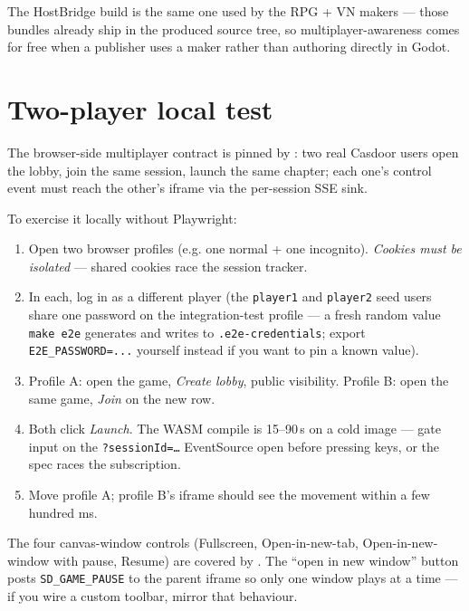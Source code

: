\documentclass[11pt,a4paper,openany]{book}
\begin{document}
The HostBridge build is the same one used by the RPG + VN makers ---
those bundles already ship 
in the produced source tree, so multiplayer-awareness comes for free
when a publisher uses a maker rather than authoring directly in Godot.

\chapter{Two-player local test}
The browser-side multiplayer contract is pinned by
: two real
Casdoor users open the lobby, join the same session, launch the same
chapter; each one's control event must reach the other's iframe via
the per-session SSE sink.

To exercise it locally without Playwright:

\begin{enumerate}
  \item Open two browser profiles (e.g. one normal + one incognito).
        \emph{Cookies must be isolated} --- shared cookies race the
        session tracker.
  \item In each, log in as a different player (the
        \texttt{player1} and \texttt{player2} seed users share one
        password on the integration-test profile — a fresh random
        value \texttt{make e2e} generates and writes to
        \texttt{.e2e-credentials}; export \texttt{E2E\_PASSWORD=...}
        yourself instead if you want to pin a known value).
  \item Profile A: open the game, \emph{Create lobby}, public
        visibility. Profile B: open the same game, \emph{Join} on the
        new row.
  \item Both click \emph{Launch}. The WASM compile is 15--90\,s on a
        cold image --- gate input on the \texttt{?sessionId=\ldots}
        EventSource open before pressing keys, or the spec races
        the subscription.
  \item Move profile A; profile B's iframe should see the movement
        within a few hundred ms.
\end{enumerate}

The four canvas-window controls (Fullscreen, Open-in-new-tab,
Open-in-new-window with pause, Resume) are covered by
. The
``open in new window'' button posts \texttt{SD\_GAME\_PAUSE} to the
parent iframe so only one window plays at a time --- if you wire a
custom toolbar, mirror that behaviour.
\end{document}
